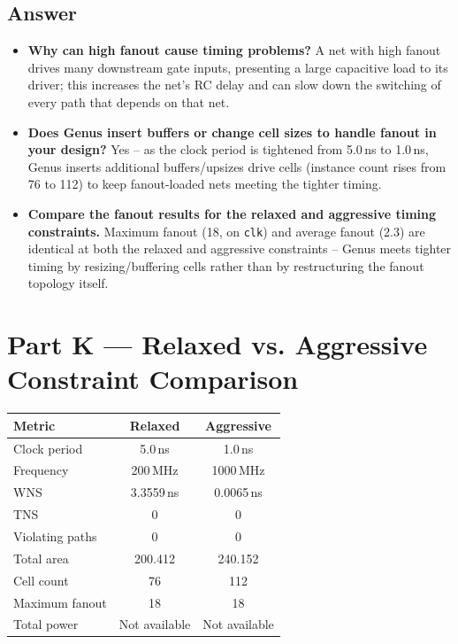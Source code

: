 \documentclass[11pt]{article}
\begin{document}
\subsection*{Answer}
\begin{itemize}
    \item \textbf{Why can high fanout cause timing problems?} A net with high fanout drives many
    downstream gate inputs, presenting a large capacitive load to its driver; this increases the
    net's RC delay and can slow down the switching of every path that depends on that net.
    \item \textbf{Does Genus insert buffers or change cell sizes to handle fanout in your design?}
    Yes -- as the clock period is tightened from 5.0\,ns to 1.0\,ns, Genus inserts additional
    buffers/upsizes drive cells (instance count rises from 76 to 112) to keep fanout-loaded nets
    meeting the tighter timing.
    \item \textbf{Compare the fanout results for the relaxed and aggressive timing constraints.}
    Maximum fanout (18, on \texttt{clk}) and average fanout (2.3) are identical at both the relaxed
    and aggressive constraints -- Genus meets tighter timing by resizing/buffering cells rather than
    by restructuring the fanout topology itself.
\end{itemize}

\section{Part K --- Relaxed vs. Aggressive Constraint Comparison}
\begin{center}
\begin{tabular}{|l|c|c|}
\hline
\textbf{Metric} & \textbf{Relaxed} & \textbf{Aggressive} \\ \hline
Clock period & 5.0\,ns & 1.0\,ns \\ \hline
Frequency & 200\,MHz & 1000\,MHz \\ \hline
WNS & 3.3559\,ns & 0.0065\,ns \\ \hline
TNS & 0 & 0 \\ \hline
Violating paths & 0 & 0 \\ \hline
Total area & 200.412 & 240.152 \\ \hline
Cell count & 76 & 112 \\ \hline
Maximum fanout & 18 & 18 \\ \hline
Total power & Not available & Not available \\ \hline
\end{tabular}
\end{center}
\end{document}
